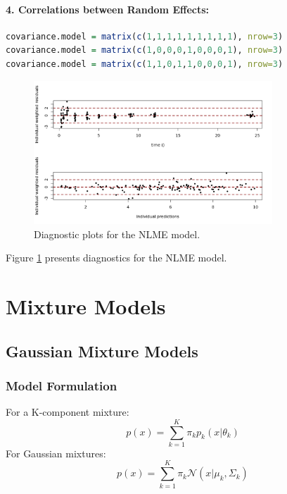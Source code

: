 \documentclass[11pt,a4paper]{article}
\begin{document}
\paragraph{4. Correlations between Random Effects:}
\begin{lstlisting}[language=R]
covariance.model = matrix(c(1,1,1,1,1,1,1,1,1), nrow=3)
covariance.model = matrix(c(1,0,0,0,1,0,0,0,1), nrow=3)
covariance.model = matrix(c(1,1,0,1,1,0,0,0,1), nrow=3)
\end{lstlisting}

\begin{figure}[htb]
    \centering
    \includegraphics[width=0.8\textwidth]{nlme-diagnostics.png}
    \caption{Diagnostic plots for the NLME model.}
    \label{fig:nlme-diagnostics}
\end{figure}

Figure \ref{fig:nlme-diagnostics} presents diagnostics for the NLME model.

\newpage

\section{Mixture Models}

\subsection{Gaussian Mixture Models}

\subsubsection{Model Formulation}
For a K-component mixture:
\begin{equation}
p(x) = \sum_{k=1}^K \pi_k p_k(x|\theta_k)
\end{equation}
For Gaussian mixtures:
\begin{equation}
p(x) = \sum_{k=1}^K \pi_k \mathcal{N}(x|\mu_k, \Sigma_k)
\end{equation}
\end{document}
